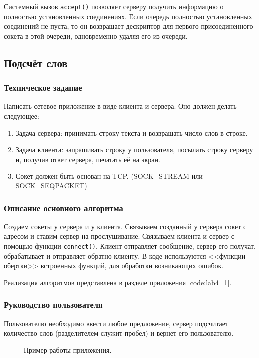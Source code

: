 \documentclass[a4paper,14pt]{extarticle}
\begin{document}
Системный вызов \verb|accept()| позволяет серверу получить информацию о полностью установленных соединениях. Если очередь полностью установленных соединений не пуста, то он возвращает дескриптор для первого присоединенного сокета в этой очереди, одновременно удаляя его из очереди.
\subsection{Подсчёт слов}
\subsubsection{Техническое задание}
Написать сетевое приложение в виде клиента и сервера. Оно должен делать следующее: 
\begin{enumerate}
	\item Задача сервера: принимать строку текста и возвращать число слов в строке.
	\item Задача клиента: запрашивать строку у пользователя, посылать строку серверу и, получив ответ сервера, печатать её на экран. 
	\item Сокет должен быть основан на TCP. (SOCK\_STREAM или SOCK\_SEQPACKET)
\end{enumerate}

\subsubsection{Описание основного алгоритма}
Создаем сокеты у сервера и у клиента. Связываем созданный у сервера сокет с адресом и ставим сервер на прослушивание. Связываем клиента и сервер с помощью функции \verb|connect()|. Клиент отправляет сообщение, сервер его получат, обрабатывает и отправляет обратно клиенту. В коде используются <<функции-обертки>> встроенных функций, для обработки возникающих ошибок.

Реализация алгоритмов представлена в разделе приложения \ref{code:lab4_1}.

\subsubsection{Руководство пользователя}

Пользователю необходимо ввести любое предложение, сервер подсчитает количество слов (разделителем служит пробел) и вернет его пользователю.
\begin{figure}[h]
\caption{Пример работы приложения.}
\label{1.png}
\end{figure}
\newpage
\end{document}
